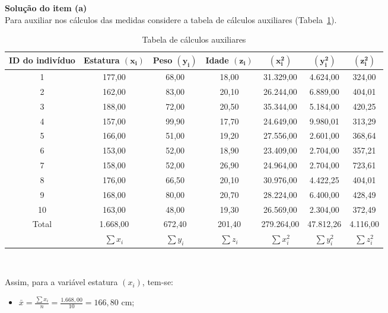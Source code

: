 \documentclass[11pt,fleqn]{book} %
\begin{document}
\begin{example}
{\bf Solução do item (a)} \\ 

Para auxiliar nos cálculos das medidas considere a tabela de cálculos auxiliares (Tabela~\ref{tab:coefvaraux}). \\

\begin{table}[h]
	\caption{Tabela de cálculos auxiliares}
	\label{tab:coefvaraux} 
	\vspace{-0.1cm}
	\centering
	\begin{tabular}{c | c c c | c c c}
	\toprule
	\textbf{ID do indivíduo} & \textbf{Estatura $\bm{(x_i)}$} & \textbf{Peso $\bm{(y_i)}$} & \textbf{Idade $\bm{(z_i)}$}
	& $\bm{(x_i^2)}$ & $\bm{(y_i^2)}$ & $\bm{(z_i^2)}$ \\
	\midrule
	1 & 177,00 & 68,00 & 18,00 & 31.329,00 & 4.624,00 & 324,00 \\
	2 & 162,00 & 83,00 & 20,10 & 26.244,00 & 6.889,00 & 404,01 \\
	3 & 188,00 & 72,00 & 20,50 & 35.344,00 & 5.184,00 & 420,25 \\
	4 & 157,00 & 99,90 & 17,70 & 24.649,00 & 9.980,01 & 313,29 \\
	5 & 166,00 & 51,00 & 19,20 & 27.556,00 & 2.601,00 & 368,64 \\
	6 & 153,00 & 52,00 & 18,90 & 23.409,00 & 2.704,00 & 357,21 \\
	7 & 158,00 & 52,00 & 26,90 & 24.964,00 & 2.704,00 & 723,61 \\
	8 & 176,00 & 66,50 & 20,10 & 30.976,00 & 4.422,25 & 404,01 \\
	9 & 168,00 & 80,00 & 20,70 & 28.224,00 & 6.400,00 & 428,49 \\
	10 & 163,00 & 48,00 & 19,30 & 26.569,00 & 2.304,00 & 372,49 \\
	\hline
	Total & 1.668,00 & 672,40 & 201,40 & 279.264,00 & 47.812,26 & 4.116,00 \\
	 & $\sum x_i$ & $\sum y_i$ & $\sum z_i$ & $\sum x_i^2$ & $\sum y_i^2$ & $\sum z_i^2$ \\
	\bottomrule
	\end{tabular} \\
\end{table}


Assim, para a variável estatura $(x_i)$, tem-se: \\

\begin{itemize}
\item $\displaystyle \bar{x}=\frac{\sum x_i}{n}=\frac{1.668,00}{10}=166,80$ cm; \\


\end{itemize}
\end{example}
\end{document}
